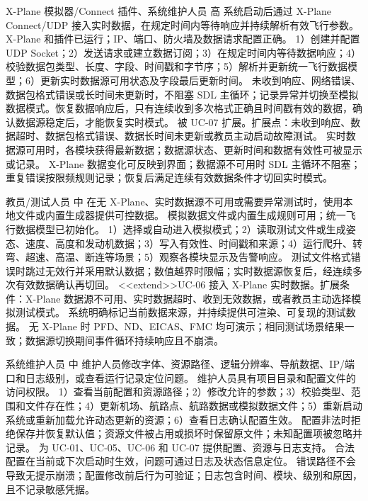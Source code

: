 \documentclass[UTF8,zihao=-4,fontset=none]{ctexart}
\begin{document}
{X-Plane 模拟器/Connect 插件、系统维护人员}
{高}
{系统启动后通过 X-Plane Connect/UDP 接入实时数据，在规定时间内等待响应并持续解析有效飞行参数。}
{X-Plane 和插件已运行；IP、端口、防火墙及数据请求配置正确。}
{1）创建并配置 UDP Socket；2）发送请求或建立数据订阅；3）在规定时间内等待数据响应；4）校验数据包类型、长度、字段、时间戳和字节序；5）解析并更新统一飞行数据模型；6）更新实时数据源可用状态及字段最后更新时间。}
{未收到响应、网络错误、数据包格式错误或长时间未更新时，不阻塞 SDL 主循环；记录异常并切换至模拟数据模式。恢复数据响应后，只有连续收到多次格式正确且时间戳有效的数据，确认数据源稳定后，才能恢复实时模式。}
{被 UC-07 扩展。扩展点：未收到响应、数据超时、数据包格式错误、数据长时间未更新或教员主动启动故障测试。}
\usecaseend
{实时数据源可用时，各模块获得最新数据；数据源状态、更新时间和数据有效性可被显示或记录。}
{X-Plane 数据变化可反映到界面；数据源不可用时 SDL 主循环不阻塞；重复错误按限频规则记录；恢复后满足连续有效数据条件才切回实时模式。}

{教员/测试人员}
{中}
{在无 X-Plane、实时数据源不可用或需要异常测试时，使用本地文件或内置生成器提供可控数据。}
{模拟数据文件或内置生成规则可用；统一飞行数据模型已初始化。}
{1）选择或自动进入模拟模式；2）读取测试文件或生成姿态、速度、高度和发动机数据；3）写入有效性、时间戳和来源；4）运行爬升、转弯、超速、高温、断连等场景；5）观察各模块显示及告警响应。}
{测试文件格式错误时跳过无效行并采用默认数据；数值越界时限幅；实时数据源恢复后，经连续多次有效数据确认再切回。}
{\textless\textless extend\textgreater\textgreater UC-06 接入 X-Plane 实时数据。扩展条件：X-Plane 数据源不可用、实时数据超时、收到无效数据，或者教员主动选择模拟测试模式。}
\usecaseend
{系统明确标记当前数据来源，并持续提供可渲染、可复现的测试数据。}
{无 X-Plane 时 PFD、ND、EICAS、FMC 均可演示；相同测试场景结果一致；数据源切换期间事件循环持续响应且不崩溃。}

{系统维护人员}
{中}
{维护人员修改字体、资源路径、逻辑分辨率、导航数据、IP/端口和日志级别，或查看运行记录定位问题。}
{维护人员具有项目目录和配置文件的访问权限。}
{1）查看当前配置和资源路径；2）修改允许的参数；3）校验类型、范围和文件存在性；4）更新机场、航路点、航路数据或模拟数据文件；5）重新启动系统或重新加载允许动态更新的资源；6）查看日志确认配置生效。}
{配置非法时拒绝保存并恢复默认值；资源文件被占用或损坏时保留原文件；未知配置项被忽略并记录。}
{为 UC-01、UC-05、UC-06 和 UC-07 提供配置、资源与日志支持。}
\usecaseend
{合法配置在当前或下次启动时生效，问题可通过日志及状态信息定位。}
{错误路径不会导致无提示崩溃；配置修改前后行为可验证；日志包含时间、模块、级别和原因，且不记录敏感凭据。}
\end{document}
